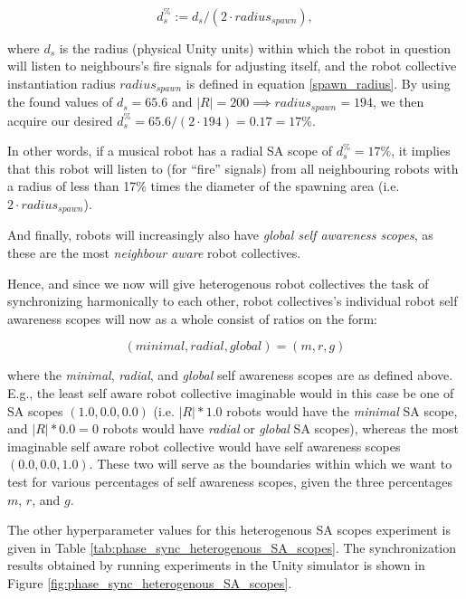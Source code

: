 			\begin{equation}\label{radial_SA_scope_perc}
			d_s^\%:=d_s/(2 \cdot radius_{spawn}),
			\end{equation}
			
			where $d_s$ is the radius (physical Unity units) within which the robot in question will listen to neighbours's fire signals for adjusting itself, and the robot collective instantiation radius $radius_{spawn}$ is defined in equation \eqref{spawn_radius}. By using the found values of $d_s=65.6$ and $|R|=200 \implies radius_{spawn}=194$, we then acquire our desired $d_s^\%=65.6/(2 \cdot 194)=0.17=17\%$.

			In other words, if a musical robot has a radial SA scope of $d_s^\%=17\%$, it implies that this robot will listen to (for ``fire'' signals) from all neighbouring robots with a radius of less than 17\% times the diameter of the spawning area (i.e. $2 \cdot radius_{spawn}$).
			
			And finally, robots will increasingly also have \textit{global self awareness scopes}, as these are the most \textit{neighbour aware} robot collectives.
			
			Hence, and since we now will give heterogenous robot collectives the task of synchronizing harmonically to each other, robot collectives's individual robot self awareness scopes will now as a whole consist of ratios on the form:
			
			\begin{equation}\label{SA_scopes_ratios}
			(minimal, radial, global) = (m, r, g)
			\end{equation}
			
			where the \textit{minimal}, \textit{radial}, and \textit{global} self awareness scopes are as defined above. E.g., the least self aware robot collective imaginable would in this case be one of SA scopes $(1.0, 0.0, 0.0)$ (i.e. $|R|*1.0$ robots would have the \textit{minimal} SA scope, and $|R|*0.0=0$ robots would have \textit{radial} or \textit{global} SA scopes), whereas the most imaginable self aware robot collective would have self awareness scopes $(0.0, 0.0, 1.0)$. These two will serve as the boundaries within which we want to test for various percentages of self awareness scopes, given the three percentages $m$, $r$, and $g$.
			
			The other hyperparameter values for this heterogenous SA scopes experiment is given in Table \ref{tab:phase_sync_heterogenous_SA_scopes}. The synchronization results obtained by running experiments in the Unity simulator is shown in Figure \ref{fig:phase_sync_heterogenous_SA_scopes}.
			
